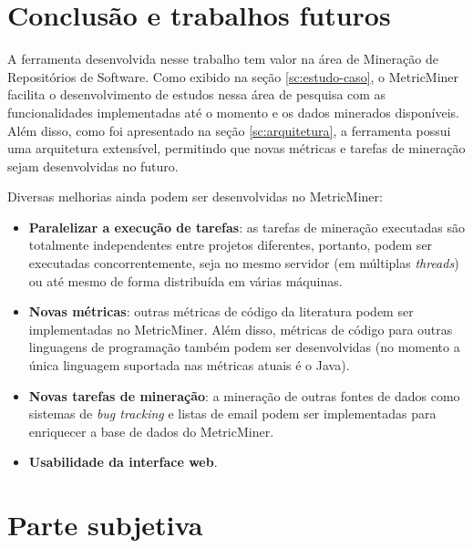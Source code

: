 \documentclass[a4paper, 12pt, twoside]{book}
\begin{document}
\chapter{Conclusão e trabalhos futuros} \label{ch:conclusao}
    
        A ferramenta desenvolvida nesse trabalho tem valor na área de Mineração de Repositórios de Software. Como exibido na seção \ref{sc:estudo-caso}, o MetricMiner facilita o desenvolvimento de estudos nessa área de pesquisa com as funcionalidades implementadas até o momento e os dados minerados disponíveis. Além disso, como foi apresentado na seção \ref{sc:arquitetura}, a ferramenta possui uma arquitetura extensível, permitindo que novas métricas e tarefas de mineração sejam desenvolvidas no futuro.

        Diversas melhorias ainda podem ser desenvolvidas no MetricMiner:
        \begin{itemize}
            \item {\bf Paralelizar a execução de tarefas}: as tarefas de mineração executadas são totalmente independentes entre projetos diferentes, portanto, podem ser executadas concorrentemente, seja no mesmo servidor (em múltiplas \textit{threads}) ou até mesmo de forma distribuída em várias máquinas.
            \item {\bf Novas métricas}: outras métricas de código da literatura podem ser implementadas no MetricMiner. Além disso, métricas de código para outras linguagens de programação também podem ser desenvolvidas (no momento a única linguagem suportada nas métricas atuais é o Java).
            \item {\bf Novas tarefas de mineração}: a mineração de outras fontes de dados como sistemas de \textit{bug tracking} e listas de email podem ser implementadas para enriquecer a base de dados do MetricMiner.
            \item {\bf Usabilidade da interface web}.
        \end{itemize}

% 

\chapter{Parte subjetiva} \label{ch:subjetiva}



\end{document}
